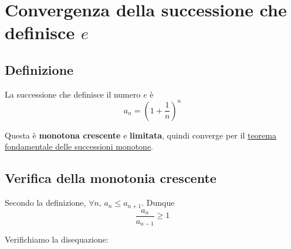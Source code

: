 \documentclass[../../dimostrazioni]{subfiles}
\begin{document}
    \chapter{Convergenza della successione che definisce \(e\)}

        \section*{Definizione}

            La successione che definisce il numero \(e\) è
            \[
                a_n = {\left(1 + \frac{1}{n}\right)}^n
            \]

            Questa è \textbf{monotona crescente} e \textbf{limitata}, quindi converge per il
            \hyperref[teoFondSuccMono]{teorema fondamentale delle successioni monotone}.

        \section*{Verifica della monotonia crescente}

            Secondo la definizione, \(\forall n, \, a_n \leqslant a_{n + 1}\). Dunque
            \[
                \frac{a_n}{a_{n - 1}} \geqslant 1
            \]

            Verifichiamo la disequazione:
\end{document}
